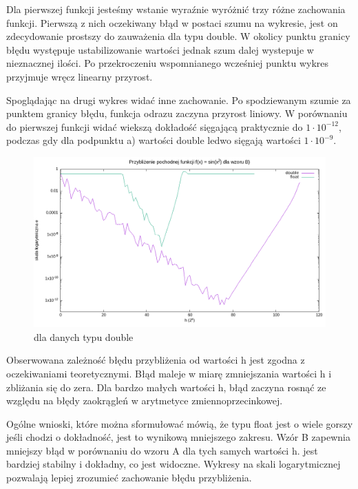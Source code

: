 \documentclass{article}
\begin{document}
    Dla pierwszej funkcji jesteśmy wstanie wyraźnie wyróżnić trzy różne zachowania
    funkcji. Pierwszą z nich oczekiwany błąd w postaci szumu na wykresie, jest on 
    zdecydowanie prostszy do zauważenia dla typu double. W okolicy punktu granicy błędu
    występuje ustabilizowanie wartości jednak szum dalej wystepuje w nieznacznej ilości.
    Po przekroczeniu wspomnianego wcześniej punktu wykres przyjmuje wręcz linearny przyrost. 


    Spoglądając na drugi wykres widać inne zachowanie. Po spodziewanym szumie za punktem 
    granicy błędu, funkcja odrazu zaczyna przyrost liniowy. W porównaniu do pierwszej 
    funkcji widać wiekszą dokładość sięgającą praktycznie do $1 \cdot 10^{-12}$, podczas
    gdy dla podpunktu a) wartości double ledwo sięgają wartości $1 \cdot 10^{-9}$.

  \begin{figure}[!ht]
    \includegraphics[width=\linewidth]{wyniki_B.png}
    \caption{dla danych typu double}
  \end{figure}
   
  Obserwowana zależność błędu przybliżenia od wartości h jest zgodna z oczekiwaniami 
  teoretycznymi. Błąd maleje w miarę zmniejszania wartości h i zbliżania się do zera.
  Dla bardzo małych wartości h, błąd zaczyna rosnąć ze względu na błędy zaokrągleń
   w arytmetyce zmiennoprzecinkowej.
  
  Ogólne wnioski, które można sformułować mówią, że typu float jest o wiele gorszy
  jeśli chodzi o dokładność, jest to wynikową mniejszego zakresu.
  Wzór B zapewnia mniejszy błąd w porównaniu do wzoru A dla tych samych wartości h.
  jest bardziej stabilny i dokładny, co jest widoczne. Wykresy na skali 
  logarytmicznej pozwalają lepiej zrozumieć zachowanie błędu przybliżenia.
\end{document}
